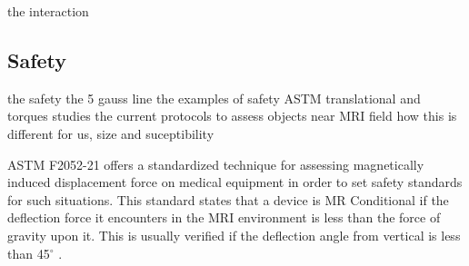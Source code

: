 the interaction

\subsection{Safety}

the safety
the 5 gauss line
the examples of safety
ASTM translational and torques studies
the current protocols to assess objects near MRI field
how this is different for us, size and suceptibility



ASTM F2052-21 offers a standardized technique for assessing magnetically induced displacement force on medical equipment in order to set safety standards for such situations. This standard states that a device is MR Conditional if the deflection force it encounters in the MRI environment is less than the force of gravity upon it. This is usually verified if the deflection angle from vertical is less than 45$^\circ$ \cite{stoianovici2024,astmF2052}.
